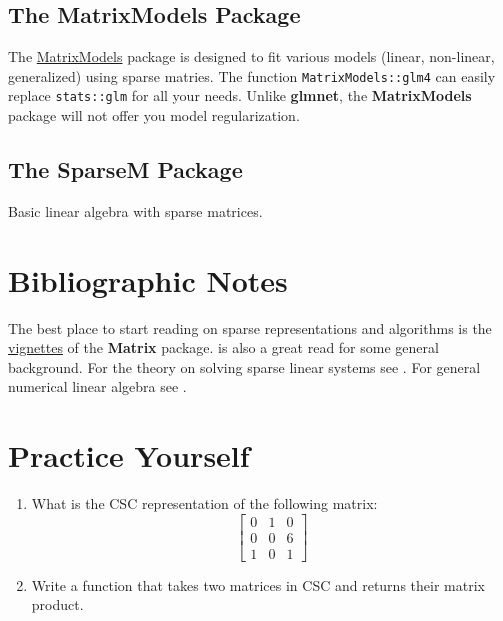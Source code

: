 \documentclass[]{book}
\theoremstyle{definition}
\theoremstyle{definition}
\theoremstyle{definition}
\theoremstyle{remark}
\begin{document}
\subsection{The MatrixModels Package}\label{the-matrixmodels-package}

The \href{https://cran.r-project.org/package=MatrixModels}{MatrixModels}
package is designed to fit various models (linear, non-linear,
generalized) using sparse matries. The function
\texttt{MatrixModels::glm4} can easily replace \texttt{stats::glm} for
all your needs. Unlike \textbf{glmnet}, the \textbf{MatrixModels}
package will not offer you model regularization.

\subsection{The SparseM Package}\label{the-sparsem-package}

Basic linear algebra with sparse matrices.

\section{Bibliographic Notes}\label{bibliographic-notes-11}

The best place to start reading on sparse representations and algorithms
is the
\href{https://cran.r-project.org/web/packages/Matrix/vignettes/Intro2Matrix.pdf}{vignettes}
of the \textbf{Matrix} package. \citet{gilbert1992sparse} is also a
great read for some general background. For the theory on solving sparse
linear systems see \citet{davis2006direct}. For general numerical linear
algebra see \citet{gentle2012numerical}.

\section{Practice Yourself}\label{practice-yourself-10}

\begin{enumerate}
\def\labelenumi{\arabic{enumi}.}
\item
  What is the CSC representation of the following matrix:
  \[\begin{bmatrix}
  0 & 1 & 0 \\
  0 & 0 & 6 \\
  1 & 0 & 1 
  \end{bmatrix}\]
\item
  Write a function that takes two matrices in CSC and returns their
  matrix product.
\end{enumerate}
\end{document}
